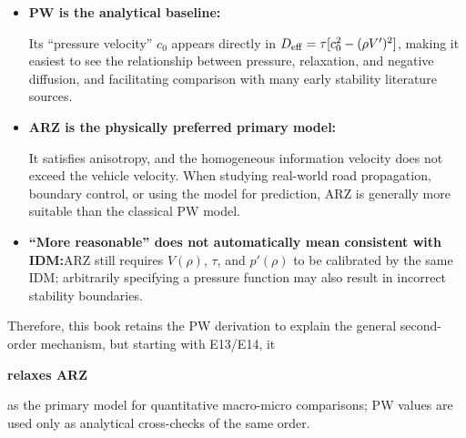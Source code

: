 \documentclass[11pt,a4paper,openany]{book}
\numberwithin{equation}{chapter}
\numberwithin{figure}{chapter}
\numberwithin{table}{chapter}
\begin{document}
\begin{tcolorbox}[notebox,title=\textbf{Since ARZ is more reasonable, why derive PW first?}]
\begin{itemize}[leftmargin=1.4em,itemsep=3pt]
\item \textbf{PW is the analytical baseline:}




Its “pressure velocity” $c_0$ appears directly in $D_{\rm eff}=\tau[c_0^2-(\rho V')^2]$, making it easiest to see the relationship between pressure, relaxation, and negative diffusion, and facilitating comparison with many early stability literature sources.







\item \textbf{ARZ is the physically preferred primary model:}




It satisfies anisotropy, and the homogeneous information velocity does not exceed the vehicle velocity. When studying real-world road propagation, boundary control, or using the model for prediction, ARZ is generally more suitable than the classical PW model.







\item \textbf{“More reasonable” does not automatically mean consistent with IDM:}ARZ still requires $V(\rho)$, $\tau$, and $p'(\rho)$ to be calibrated by the same IDM; arbitrarily specifying a pressure function may also result in incorrect stability boundaries.







\end{itemize}







Therefore, this book retains the PW derivation to explain the general second-order mechanism, but starting with E13/E14, it




\textbf{relaxes ARZ}




as the primary model for quantitative macro-micro comparisons; PW values are used only as analytical cross-checks of the same order.







\end{tcolorbox}
\end{document}
